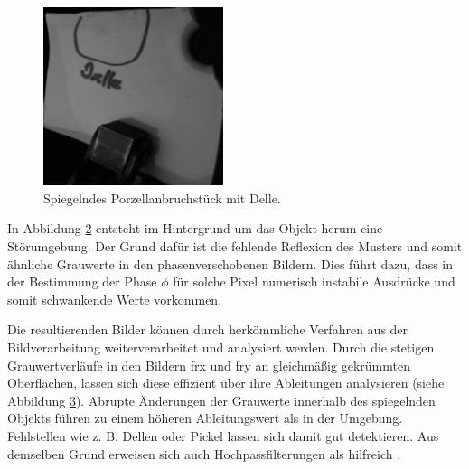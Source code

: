 {
	\begin{figure}[H]
		\centering
		\includegraphics[width = 0.47\textwidth]{04_deflektometrischeRegistrierung/auswertungDeflektometrischeRegistrierung/figures/delleBeleuchtet}
		\caption[Spiegelndes Porzellanbruchstück mit Delle]{Spiegelndes Porzellanbruchstück mit Delle.}
		\label{img:objektMitDelle}
	\end{figure}
}

{
	\begin{figure}[H]
		\centering
		
		\label{tikz:abbRegistrierungDelle}
	\end{figure}
}

\noindent
In Abbildung \ref{tikz:abbRegistrierungDelle} entsteht im Hintergrund um das Objekt herum eine Störumgebung.
Der Grund dafür ist die fehlende Reflexion des Musters und somit ähnliche Grauwerte in den phasenverschobenen Bildern.
Dies führt dazu, dass in der Bestimmung der Phase $\phi$ für solche Pixel numerisch instabile Ausdrücke und somit schwankende Werte vorkommen.

\p
Die resultierenden Bilder können durch herkömmliche Verfahren aus der Bildverarbeitung weiterverarbeitet und analysiert werden.
Durch die stetigen Grauwertverläufe in den Bildern \acrshort{frx} und \acrshort{fry} an gleichmäßig gekrümmten Oberflächen, lassen sich diese effizient über ihre Ableitungen analysieren (siehe Abbildung \ref{tikz:abbGradientenbildReg}).
Abrupte Änderungen der Grauwerte innerhalb des spiegelnden Objekts führen zu einem höheren Ableitungswert als in der Umgebung. Fehlstellen wie z. B. Dellen oder Pickel lassen sich damit gut detektieren.
Aus demselben Grund erweisen sich auch Hochpassfilterungen als hilfreich \cite{kit_werling}.

{
	\begin{figure}[H]
		\centering
		
		\label{tikz:abbGradientenbildReg}
	\end{figure}
}

